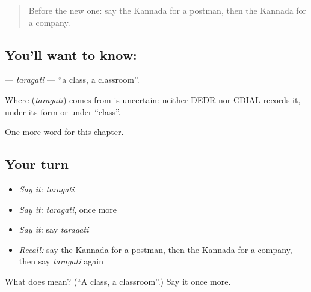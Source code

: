 \label{lesson:KA-C268-taragati}



\begin{quote}
Before the new one: say the Kannada for a postman, then the Kannada for a company.
\end{quote}

\subsection*{You'll want to know: }
\textbf{} — \emph{taragati} — \textquotedblleft{}a class, a classroom\textquotedblright{}.

\begin{cousinweb}
Where \textbf{} (\emph{taragati}) comes from is uncertain: neither DEDR nor CDIAL records it, under its form or under \textquotedblleft{}class\textquotedblright{}.
\end{cousinweb}

\begin{grammarlens}[title={What you've built}]
One more word for this chapter.
\end{grammarlens}

\subsection*{Your turn}
\begin{itemize}
\raggedright
  \item \emph{Say it:} \emph{taragati}
  \item \emph{Say it:} \emph{taragati}, once more
  \item \emph{Say it:} say \emph{taragati}
  \item \emph{Recall:} say the Kannada for a postman, then the Kannada for a company, then say \emph{taragati} again
\end{itemize}

\begin{tcolorbox}[breakable,colback=teal!4,colframe=teal!35!black,title={Before you move on}]
What does  mean? (\textquotedblleft{}A class, a classroom\textquotedblright{}.) Say it once more.
\end{tcolorbox}
